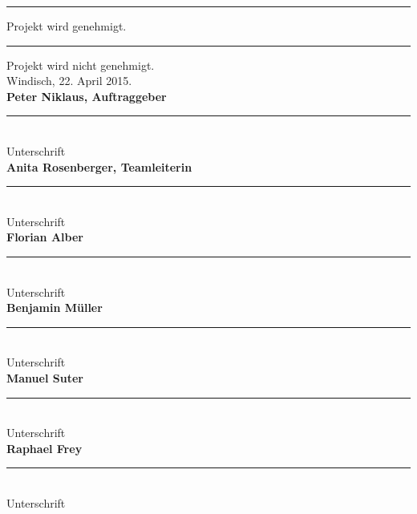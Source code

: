 
\rule{10mm}{0.05em} Projekt wird genehmigt. \hspace{20mm} \rule{10mm}{0.05em} Projekt wird nicht genehmigt.\\

Windisch, 22. April 2015. \\

\textbf{Peter Niklaus, Auftraggeber}
\vspace*{15mm} \\
\rule{70mm}{0.05em} \\
Unterschrift \\

\textbf{Anita Rosenberger, Teamleiterin}
\vspace*{15mm} \\
\rule{70mm}{0.05em} \\
Unterschrift \\

\textbf{Florian Alber}
\vspace*{15mm} \\
\rule{70mm}{0.05em} \\
Unterschrift \\

\textbf{Benjamin M\"uller}
\vspace*{15mm} \\
\rule{70mm}{0.05em} \\
Unterschrift \\

\textbf{Manuel Suter}
\vspace*{15mm} \\
\rule{70mm}{0.05em} \\
Unterschrift \\

\textbf{Raphael Frey}
\vspace*{15mm} \\
\rule{70mm}{0.05em} \\
Unterschrift
